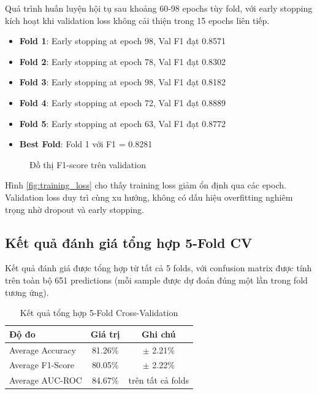 Quá trình huấn luyện hội tụ sau khoảng 60-98 epochs tùy fold, với early stopping kích hoạt khi validation loss không cải thiện trong 15 epochs liên tiếp.

\begin{itemize}
    \item \textbf{Fold 1}: Early stopping at epoch 98, Val F1 đạt 0.8571
    \item \textbf{Fold 2}: Early stopping at epoch 78, Val F1 đạt 0.8302
    \item \textbf{Fold 3}: Early stopping at epoch 98, Val F1 đạt 0.8182
    \item \textbf{Fold 4}: Early stopping at epoch 72, Val F1 đạt 0.8889
    \item \textbf{Fold 5}: Early stopping at epoch 63, Val F1 đạt 0.8772
    \item \textbf{Best Fold}: Fold 1 với F1 = 0.8281
\end{itemize}

\begin{figure}[h]
    \centering
    \begin{minipage}{0.45\textwidth}
        \centering
        \caption[Đồ thị Loss qua các epoch]{Đồ thị Loss qua các epoch}
        \label{fig:training_loss}
    \end{minipage}
    \hfill
    \begin{minipage}{0.45\textwidth}
        \centering
        \caption[Đồ thị F1-score trên validation]{Đồ thị F1-score trên validation}
        \label{fig:training_f1}
    \end{minipage}
\end{figure}

Hình \ref{fig:training_loss} cho thấy training loss giảm ổn định qua các epoch. Validation loss duy trì cùng xu hướng, không có dấu hiệu overfitting nghiêm trọng nhờ dropout và early stopping.

\subsection{Kết quả đánh giá tổng hợp 5-Fold CV}
\label{sec:aggregated_results}

Kết quả đánh giá được tổng hợp từ tất cả 5 folds, với confusion matrix được tính trên toàn bộ 651 predictions (mỗi sample được dự đoán đúng một lần trong fold tương ứng).

\begin{table}[h]
\centering
\caption{Kết quả tổng hợp 5-Fold Cross-Validation}
\label{tab:aggregated_results}
\begin{tabular}{|l|c|c|}
\hline
\textbf{Độ đo} & \textbf{Giá trị} & \textbf{Ghi chú} \\
\hline
Average Accuracy & 81.26\% & $\pm$ 2.21\% \\
\hline
Average F1-Score & 80.05\% & $\pm$ 2.22\% \\
\hline
Average AUC-ROC & 84.67\% & trên tất cả folds \\
\hline
\end{tabular}
\end{table}

